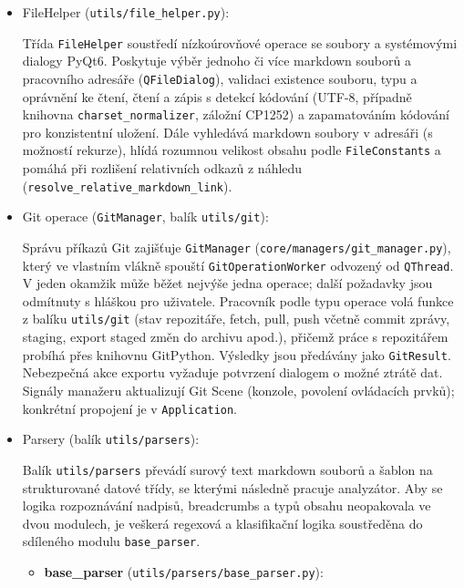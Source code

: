 \documentclass[12pt, a4paper]{article}
\begin{document}
\begin{itemize}
    \item FileHelper (\texttt{utils/file\_helper.py}):

    Třída \texttt{FileHelper} soustředí nízkoúrovňové operace se soubory a systémovými dialogy PyQt6. 
    Poskytuje výběr jednoho či více markdown souborů a pracovního adresáře (\texttt{QFileDialog}), 
    validaci existence souboru, typu a oprávnění ke čtení, čtení a zápis s detekcí kódování 
    (UTF-8, případně knihovna \texttt{charset\_normalizer}, záložní CP1252) a zapamatováním kódování pro konzistentní uložení. 
    Dále vyhledává markdown soubory v adresáři (s možností rekurze), hlídá rozumnou velikost obsahu podle \texttt{FileConstants} 
    a pomáhá při rozlišení relativních odkazů z náhledu (\texttt{resolve\_relative\_markdown\_link}).

    \item Git operace (\texttt{GitManager}, balík \texttt{utils/git}):

    Správu příkazů Git zajišťuje \texttt{GitManager} (\texttt{core/managers/git\_manager.py}),
    který ve vlastním vlákně spouští \texttt{GitOperationWorker} odvozený od \texttt{QThread}.
    V jeden okamžik může běžet nejvýše jedna operace; další požadavky jsou odmítnuty s hláškou pro uživatele.
    Pracovník podle typu operace volá funkce z balíku \texttt{utils/git}
    (stav repozitáře, fetch, pull, push včetně commit zprávy, staging, export staged změn do archivu apod.),
    přičemž práce s repozitářem probíhá přes knihovnu GitPython. Výsledky jsou předávány jako \texttt{GitResult}.
    Nebezpečná akce exportu vyžaduje potvrzení dialogem o možné ztrátě dat. Signály manažeru aktualizují Git Scene
    (konzole, povolení ovládacích prvků); konkrétní propojení je v \texttt{Application}.

    \item Parsery (balík \texttt{utils/parsers}):

    Balík \texttt{utils/parsers} převádí surový text markdown souborů a šablon na strukturované
    datové třídy, se kterými následně pracuje analyzátor. Aby se logika rozpoznávání nadpisů,
    breadcrumbs a typů obsahu neopakovala ve dvou modulech, je veškerá regexová a klasifikační
    logika soustředěna do sdíleného modulu \texttt{base\_parser}.

    \begin{itemize}
        \item \textbf{base\_parser} (\texttt{utils/parsers/base\_parser.py}):


\end{itemize}
\end{itemize}
\end{document}
